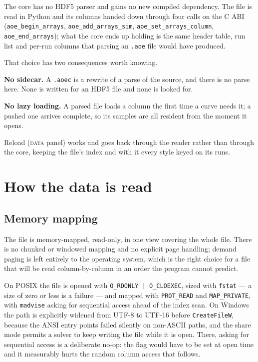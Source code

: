 \documentclass[11pt,a4paper,oneside]{report}
\newcommand{\code}[1]{\texttt{#1}}
\begin{document}
The core has no HDF5 parser and gains no new compiled dependency. The file is
read in Python and its columns handed down through four calls on the C ABI
(\code{aoe\_begin\_arrays}, \code{aoe\_add\_arrays\_sim},
\code{aoe\_set\_arrays\_column}, \code{aoe\_end\_arrays}); what the core ends up
holding is the same header table, run list and per-run columns that parsing an
\code{.aoe} file would have produced.

That choice has two consequences worth knowing.

\begin{aoelimit}
\textbf{No sidecar.} A \code{.aoec} is a rewrite of a parse of the source, and
there is no parse here. None is written for an HDF5 file and none is looked
for.

\textbf{No lazy loading.} A parsed file loads a column the first time a curve
needs it; a pushed one arrives complete, so its samples are all resident from
the moment it opens.
\end{aoelimit}

Reload (\textsc{data} panel) works and goes back through the reader rather than
through the core, keeping the file's index and with it every style keyed on its
runs.

\chapter{How the data is read}
\label{ch:reading}

\section{Memory mapping}

The file is memory-mapped, read-only, in one view covering the whole file. There
is no chunked or windowed mapping and no explicit page handling; demand paging is
left entirely to the operating system, which is the right choice for a file that
will be read column-by-column in an order the program cannot predict.

On POSIX the file is opened with \code{O\_RDONLY | O\_CLOEXEC}, sized with
\code{fstat} --- a size of zero or less is a failure --- and mapped with
\code{PROT\_READ} and \code{MAP\_PRIVATE}, with \code{madvise} asking for
sequential access ahead of the index scan. On Windows the path is explicitly
widened from UTF-8 to UTF-16 before \code{CreateFileW}, because the ANSI entry
points failed silently on non-ASCII paths, and the share mode permits a solver to
keep writing the file while it is open. There, asking for sequential access is a
deliberate no-op: the flag would have to be set at open time and it measurably
hurts the random column access that follows.
\end{document}
